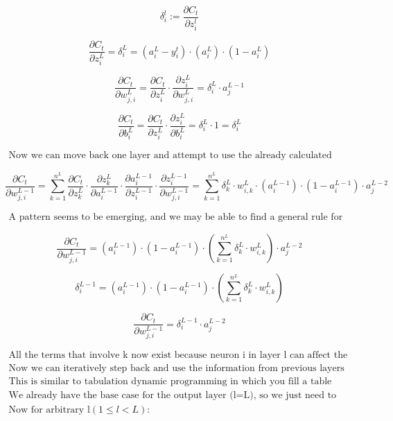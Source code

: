 \documentclass{article}
\begin{document}
\[
\delta_{i}^{l}:=\frac{\partial C_{t}}{\partial z_{i}^{l}}
\]

\[
\frac{\partial C_{t}}{\partial z_{i}^{L}}=\delta_{i}^{L}=(a_{i}^{L}-y_{i}^{t}) \cdot (a_{i}^{L}) \cdot (1 - a_{i}^{L})
\]

\[
\frac{\partial C_{t}}{\partial w_{j,i}^{L}}=\frac{\partial C_{t}}{\partial z_{i}^{L}} \cdot \frac{\partial z_{i}^{L}}{\partial w_{j,i}^{L}}=\delta_{i}^{L} \cdot a_{j}^{L-1}
\]

\[
\frac{\partial C_{t}}{\partial b_{i}^{L}}=\frac{\partial C_{t}}{\partial z_{i}^{L}} \cdot \frac{\partial z_{i}^{L}}{\partial b_{i}^{L}}=\delta_{i}^{L} \cdot 1=\delta_{i}^{L}
\]

\begin{gather*}
\text{Now we can move back one layer and attempt to use the already calculated values}
\end{gather*}

\[
\frac{\partial C_{t}}{\partial w_{j,i}^{L-1}}=\sum_{k=1}^{n^{L}}\frac{\partial C_{t}}{\partial z_{k}^{L}} \cdot \frac{\partial z_{k}^{L}}{\partial a_{i}^{L-1}} \cdot \frac{\partial a_{i}^{L-1}}{\partial z_{i}^{L-1}} \cdot \frac{\partial z_{i}^{L-1}}{\partial w_{j,i}^{L-1}}=\sum_{k=1}^{n^{L}}\delta_{k}^{L} \cdot w_{i,k}^{L} \cdot (a_{i}^{L-1}) \cdot (1 - a_{i}^{L-1}) \cdot a_{j}^{L-2}
\]

\begin{gather*}
\text{A pattern seems to be emerging, and we may be able to find a general rule for any layer}
\end{gather*}

\[
\frac{\partial C_{t}}{\partial w_{j,i}^{L-1}}=(a_{i}^{L-1}) \cdot (1 - a_{i}^{L-1}) \cdot (\sum_{k=1}^{n^{L}}\delta_{k}^{L} \cdot w_{i,k}^{L}) \cdot a_{j}^{L-2}
\]

\[
\delta_{i}^{L-1}=(a_{i}^{L-1}) \cdot (1 - a_{i}^{L-1}) \cdot (\sum_{k=1}^{n^{L}}\delta_{k}^{L} \cdot w_{i,k}^{L})
\]

\[
\frac{\partial C_{t}}{\partial w_{j,i}^{L-1}}=\delta_{i}^{L-1} \cdot a_{j}^{L-2}
\]

\begin{gather*}
\text{All the terms that involve k now exist because neuron i in layer l can affect the cost through all k nodes in layer l+1} \\[0.3em]
\text{Now we can iteratively step back and use the information from previous layers to efficiently calculate the next} \\[0.3em]
\text{This is similar to tabulation dynamic programming in which you fill a table iteratively} \\[0.3em]
\text{We already have the base case for the output layer (l=L), so we just need to derive a new formula for all hidden layers} \\[0.3em]
\text{Now for arbitrary l} (1 \leq l < L):
\end{gather*}
\end{document}
